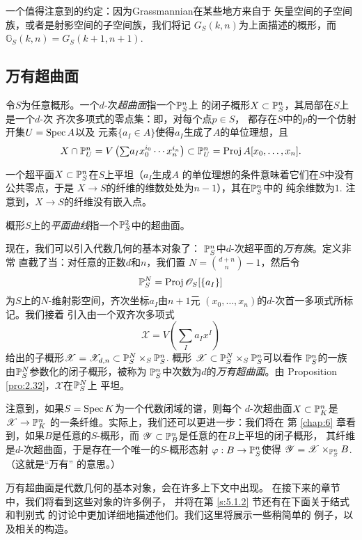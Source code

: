 一个值得注意到的约定：因为Grassmannian在某些地方来自于
矢量空间的子空间族，或者是射影空间的子空间族，我们将记
$G_S(k,n)$为上面描述的概形，而$\mathbb G_S(k,n)=
G_S(k+1,n+1)$.

\subsection{万有超曲面} \label{s:3.2.8}

\begin{defi}\label{defi:3.50}
令$S$为任意概形。一个$d$-次\textit{超曲面}指一个$\P_S^n$上
的闭子概形$X\subset \P_S^n$，其局部在$S$上是一个$d$-次
齐次多项式的零点集：即，对每个点$p\in S$，
都存在$S$中的$p$的一个仿射开集$U=\spec A$以及
元素$\{a_I\in A\}$使得$a_I$生成了$A$的单位理想，且
\[
	\textstyle{X\cap \P_U^n=V\left(
		{\sum}a_I x_0^{i_0}\cdots x_n^{i_n}
	\right)\subset \P_U^n=\proj A[x_0,\dots,x_n].}
\]
\end{defi}


一个超平面$X\subset \P_S^n$在$S$上平坦（$a_I$生成$A$
的单位理想的条件意味着它们在$S$中没有公共零点，于是
$X\to S$的纤维的维数处处为$n-1$），其在$\P_S^n$中的
纯余维数为$1$. 注意到，$X\to S$的纤维没有嵌入点。

概形$S$上的\textit{平面曲线}指一个$\P_S^2$中的超曲面。

现在，我们可以引入代数几何的基本对象了：
$\P^n_S$中$d$-次超平面的\textit{万有族}。定义非常
直截了当：对任意的正数$d$和$n$，我们置
$N=\binom{d+n}{n}-1$，然后令
\[
	\P^N_S=\proj \oo_S[\{a_I\}]
\]
为$S$上的$N$-维射影空间，齐次坐标$a_I$由$n+1$元
$(x_0,\dots,x_n)$的$d$-次首一多项式所标记。我们接着
引入由一个双齐次多项式
\[
	\mathscr X=V\left(\sum_I a_I x^I\right)
\]
给出的子概形$\mathscr X=\mathscr X_{d,n}
\subset \P_S^N\times_S \P_S^n$. 概形
$\mathscr X\subset \P_S^N\times_S \P_S^n$可以看作
$\P_S^n$的一族由$\P_S^N$参数化的闭子概形，被称为
$\P_S^n$中次数为$d$的\textit{万有超曲面}。由
Proposition \ref{pro:2.32}，$\mathscr X$在$\P_S^N$上
平坦。

注意到，如果$S=\spec K$为一个代数闭域的谱，则每个
$d$-次超曲面$X\subset \P_K^n$是$\mathscr X\to \P_K^n$
的一条纤维。实际上，我们还可以更进一步：我们将在
第 \ref{chap:6} 章看到，如果$B$是任意的$S$-概形，而
$\mathscr Y\subset \P_B^n$是任意的在$B$上平坦的闭子概形，
其纤维是$d$-次超曲面，于是存在一个唯一的$S$-概形态射
$\varphi:B\to \P_S^n$使得
$\mathscr Y=\mathscr X\times_{\P_S^n}B$. （这就是“万有”
的意思。）

万有超曲面是代数几何的基本对象，会在许多上下文中出现。
在接下来的章节中，我们将看到这些对象的许多例子，
并将在第 \ref{s:5.1.2} 节还有在下面关于结式和判别式
的讨论中更加详细地描述他们。我们这里将展示一些稍简单的
例子，以及相关的构造。

